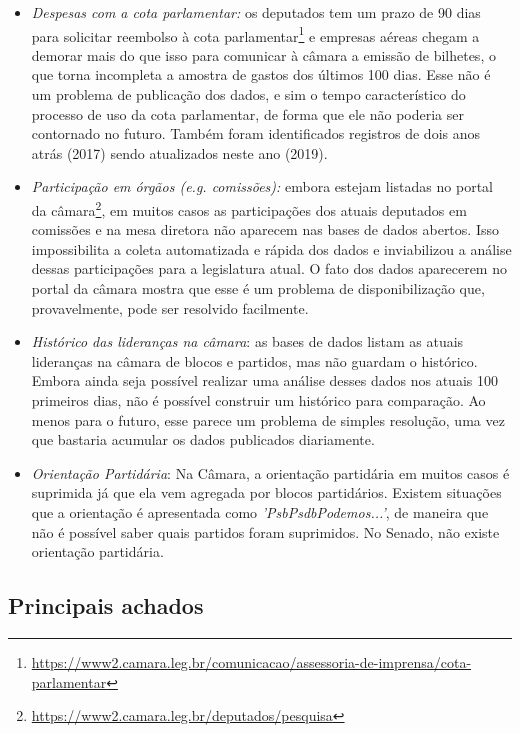 \documentclass[12pt,a4paper]{article}
\newcommand{\footurl}[1]{{\scriptsize\url{#1}}}
\begin{document}
\begin{itemize}

\item \emph{Despesas com a cota parlamentar:} os deputados tem um prazo de 90 dias para solicitar reembolso
  à cota parlamentar\footnote{\footurl{https://www2.camara.leg.br/comunicacao/assessoria-de-imprensa/cota-parlamentar}}
  e empresas aéreas chegam a demorar mais do que isso para comunicar à câmara a emissão de
  bilhetes, o que torna incompleta a amostra de gastos dos últimos 100 dias. Esse não é um problema de publicação dos
  dados, e sim o tempo característico do processo de uso da cota parlamentar, de forma que ele não poderia ser contornado
  no futuro. Também foram identificados registros de dois anos atrás (2017) sendo atualizados neste ano (2019).   

\item \emph{Participação em órgãos (e.g. comissões):} embora estejam listadas no portal da
  câmara\footnote{\footurl{https://www2.camara.leg.br/deputados/pesquisa}}, em muitos casos as participações
  dos atuais deputados em comissões e na mesa diretora não aparecem nas bases de dados abertos. Isso
  impossibilita a coleta automatizada e rápida dos dados e inviabilizou a análise dessas participações para
  a legislatura atual. O fato dos dados aparecerem no portal da câmara mostra que esse é um problema de
  disponibilização que, provavelmente, pode ser resolvido facilmente.

\item \emph{Histórico das lideranças na câmara}: as bases de dados listam as atuais lideranças na câmara
  de blocos e partidos, mas não guardam o histórico. Embora ainda seja possível realizar uma análise desses 
  dados nos atuais 100 primeiros dias, não é possível construir um histórico para comparação. Ao menos para
  o futuro, esse parece um problema de simples resolução, uma vez que bastaria acumular os dados publicados
  diariamente.
  
\item \emph{Orientação Partidária}: Na Câmara, a orientação partidária em muitos casos é suprimida já que ela vem agregada por blocos partidários. Existem situações que a orientação é apresentada como \textit{'PsbPsdbPodemos...'}, de maneira que não é possível saber quais partidos foram suprimidos. No Senado, não existe orientação partidária.
\end{itemize}

\subsection{Principais achados}
\end{document}
